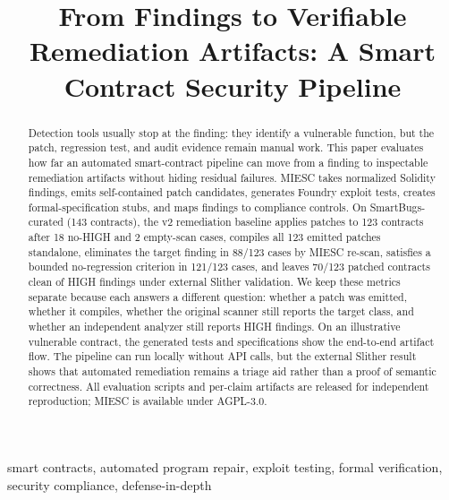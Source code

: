 \documentclass[conference]{IEEEtran}
\begin{document}
\title{From Findings to Verifiable Remediation Artifacts: A Smart Contract Security Pipeline}

\author{
}

\maketitle

\begin{abstract}
Detection tools usually stop at the finding: they identify a vulnerable function, but the patch, regression test, and audit evidence remain manual work. This paper evaluates how far an automated smart-contract pipeline can move from a finding to inspectable remediation artifacts without hiding residual failures. MIESC takes normalized Solidity findings, emits self-contained patch candidates, generates Foundry exploit tests, creates formal-specification stubs, and maps findings to compliance controls. On SmartBugs-curated (143 contracts), the v2 remediation baseline applies patches to 123 contracts after 18 no-HIGH and 2 empty-scan cases, compiles all 123 emitted patches standalone, eliminates the target finding in 88/123 cases by MIESC re-scan, satisfies a bounded no-regression criterion in 121/123 cases, and leaves 70/123 patched contracts clean of HIGH findings under external Slither validation. We keep these metrics separate because each answers a different question: whether a patch was emitted, whether it compiles, whether the original scanner still reports the target class, and whether an independent analyzer still reports HIGH findings. On an illustrative vulnerable contract, the generated tests and specifications show the end-to-end artifact flow. The pipeline can run locally without API calls, but the external Slither result shows that automated remediation remains a triage aid rather than a proof of semantic correctness. All evaluation scripts and per-claim artifacts are released for independent reproduction; MIESC is available under AGPL-3.0.
\end{abstract}

\begin{IEEEkeywords}
smart contracts, automated program repair, exploit testing, formal verification, security compliance, defense-in-depth
\end{IEEEkeywords}

\end{document}
